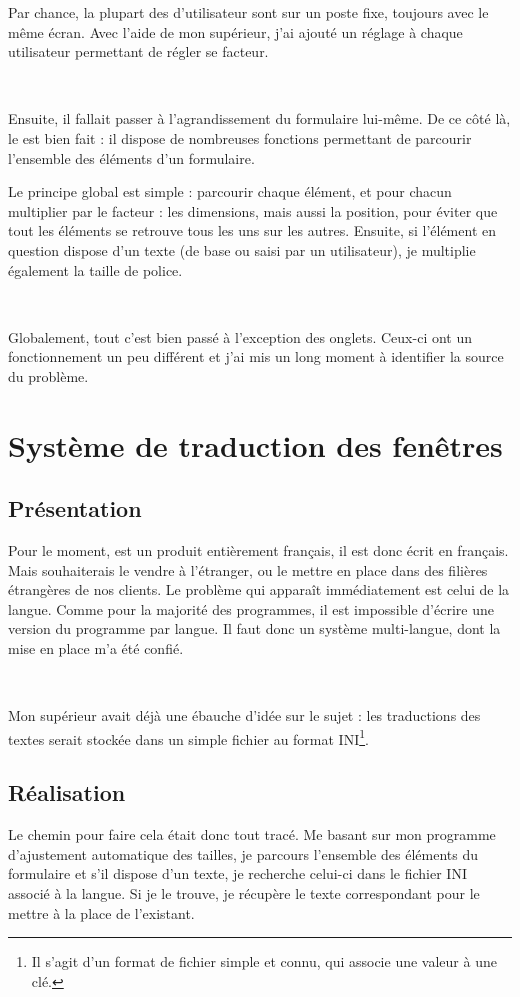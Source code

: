 Par chance, la plupart des d'utilisateur sont sur un poste fixe, toujours avec le même écran. Avec l'aide de mon supérieur, j'ai ajouté un réglage à chaque utilisateur permettant de régler se facteur.

~

Ensuite, il fallait passer à l'agrandissement du formulaire lui-même. De ce côté là, le \vb{} est bien fait : il dispose de nombreuses fonctions permettant de parcourir l'ensemble des éléments d'un formulaire.

Le principe global est simple : parcourir chaque élément, et pour chacun multiplier par le facteur : les dimensions, mais aussi la position, pour éviter que tout les éléments se retrouve tous les uns sur les autres. Ensuite, si l'élément en question dispose d'un texte (de base ou saisi par un utilisateur), je multiplie également la taille de police.

~

Globalement, tout c'est bien passé à l'exception des onglets. Ceux-ci ont un fonctionnement un peu différent et j'ai mis un long moment à identifier la source du problème.

\section{Système de traduction des fenêtres}
\subsection{Présentation}
Pour le moment, \integrale{} est un produit entièrement français, il est donc écrit en français. Mais \solulog{} souhaiterais le vendre à l'étranger, ou le mettre en place dans des filières étrangères de nos clients. Le problème qui apparaît immédiatement est celui de la langue. Comme pour la majorité des programmes, il est impossible d'écrire une version du programme par langue. Il faut donc un système multi-langue, dont la mise en place m'a été confié.

~

Mon supérieur avait déjà une ébauche d'idée sur le sujet : les traductions des textes serait stockée dans un simple 	fichier au format INI\footnote{Il s'agit d'un format de fichier simple et connu, qui associe une valeur à une clé.}.

\subsection{Réalisation}
Le chemin pour faire cela était donc tout tracé. Me basant sur mon programme d'ajustement automatique des tailles, je parcours l'ensemble des éléments du formulaire et s'il dispose d'un texte, je recherche celui-ci dans le fichier INI associé à la langue. Si je le trouve, je récupère le texte correspondant pour le mettre à la place de l'existant.


